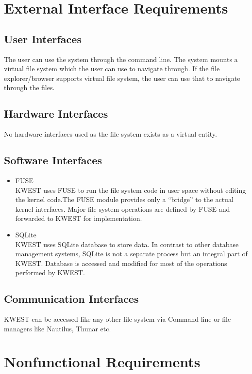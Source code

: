\section {External Interface Requirements}

\subsection {User Interfaces}
The user can use the system through the command line. The system mounts a virtual file system which the user can use to navigate through. If the file explorer/browser supports virtual file system, the user can use that to navigate through the files. 

\subsection {Hardware Interfaces}
No hardware interfaces used as the file system exists as a virtual entity.

\subsection {Software Interfaces}
\begin{itemize}
\item FUSE\cite{FUSE} \\
KWEST uses FUSE to run the file system code in user space without editing the kernel code.The FUSE module provides only a ``bridge'' to the actual kernel interfaces. Major file system operations are defined by FUSE and forwarded to KWEST for implementation.
\item SQLite\cite{SQLITE} \\
KWEST uses SQLite database to store data. In contrast to other database management systems, SQLite is not a separate process but an integral part of KWEST. Database is accessed and modified for most of the operations performed by KWEST.
\end{itemize}
\subsection {Communication Interfaces}
KWEST can be accessed like any other file system via Command line or file managers like Nautilus, Thunar etc.

\section {Nonfunctional Requirements}

